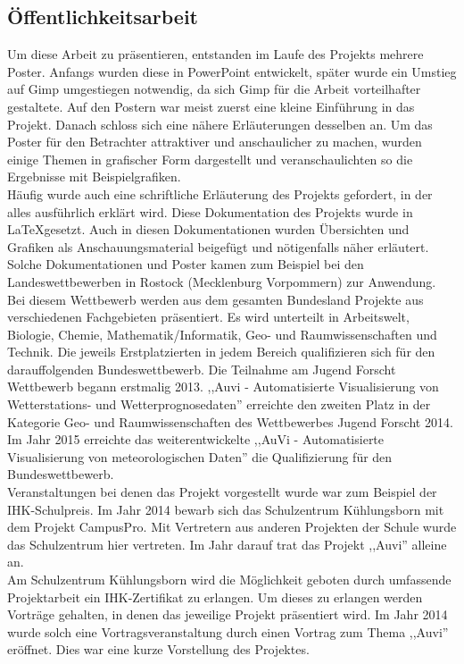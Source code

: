 \subsection{Öffentlichkeitsarbeit} %
Um diese Arbeit zu präsentieren, entstanden im Laufe des Projekts mehrere Poster.
Anfangs wurden diese in PowerPoint entwickelt, später wurde ein Umstieg
auf Gimp umgestiegen notwendig,
da sich Gimp für die Arbeit vorteilhafter gestaltete.
Auf den Postern war meist zuerst eine kleine Einführung in das Projekt.
Danach schloss sich eine nähere Erläuterungen desselben an.
Um das Poster für den Betrachter attraktiver und anschaulicher zu machen,
wurden einige Themen in grafischer Form dargestellt und
veranschaulichten so die Ergebnisse mit Beispielgrafiken. \\
Häufig wurde auch eine schriftliche Erläuterung des Projekts gefordert,
in der alles ausführlich erklärt wird.
Diese Dokumentation des Projekts wurde in \LaTeX gesetzt.
Auch in diesen Dokumentationen wurden Übersichten und Grafiken als Anschauungsmaterial
beigefügt und nötigenfalls näher erläutert.\\
Solche Dokumentationen und Poster kamen zum Beispiel bei
den Landeswettbewerben \jf in Rostock (Mecklenburg Vorpommern) zur Anwendung.
Bei diesem Wettbewerb werden aus dem gesamten
Bundesland Projekte aus verschiedenen Fachgebieten präsentiert.
Es wird unterteilt in Arbeitswelt, Biologie, Chemie,
Mathematik/Informatik, Geo- und Raumwissenschaften und Technik.
Die jeweils Erstplatzierten in jedem Bereich
qualifizieren sich für den darauffolgenden Bundeswettbewerb.
Die Teilnahme am Jugend Forscht Wettbewerb begann erstmalig 2013.
,,Auvi - Automatisierte Visualisierung von Wetterstations- und Wetterprognosedaten''
erreichte den zweiten Platz in der Kategorie Geo- und Raumwissenschaften des Wettbewerbes
Jugend Forscht 2014.
Im Jahr 2015 erreichte das weiterentwickelte
,,AuVi - Automatisierte Visualisierung von meteorologischen Daten''
die Qualifizierung für den Bundeswettbewerb.\\
Veranstaltungen bei denen das Projekt vorgestellt wurde war zum Beispiel der IHK-Schulpreis.
Im Jahr 2014 bewarb sich das Schulzentrum Kühlungsborn mit dem Projekt CampusPro.
Mit Vertretern aus anderen Projekten der Schule wurde das Schulzentrum hier vertreten.
Im Jahr darauf trat das Projekt ,,Auvi'' alleine an.\\
Am Schulzentrum Kühlungsborn wird die Möglichkeit geboten durch
umfassende Projektarbeit ein IHK-Zertifikat zu erlangen.
Um dieses zu erlangen werden Vorträge gehalten, in denen das jeweilige Projekt präsentiert wird.
Im Jahr 2014 wurde solch eine Vortragsveranstaltung durch einen Vortrag zum Thema ,,Auvi'' eröffnet.
Dies war eine kurze Vorstellung des Projektes.
